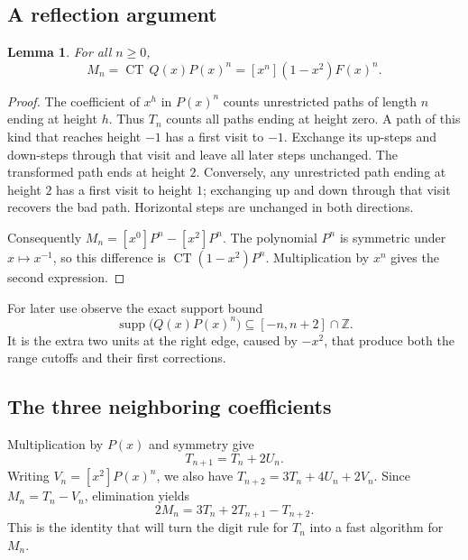 \documentclass[11pt,a4paper]{article}
\numberwithin{equation}{section}
\newtheorem{lemma}[theorem]{Lemma}
\theoremstyle{definition}
\theoremstyle{remark}
\DeclareMathOperator{\CT}{CT}
\DeclareMathOperator{\supp}{supp}
\newcommand{\Z}{\mathbb Z}
\begin{document}
\subsection{A reflection argument}
\begin{lemma}\label{lem:reflection}
For all $n\geq0$,
\begin{equation}\label{eq:Mct}
 M_n=\CT\,Q(x)P(x)^n=[x^n](1-x^2)F(x)^n.
\end{equation}
\end{lemma}
\begin{proof}
The coefficient of $x^h$ in $P(x)^n$ counts unrestricted paths of length
$n$ ending at height $h$. Thus $T_n$ counts all paths ending at height
zero. A path of this kind that reaches height $-1$ has a first visit to
$-1$. Exchange its up-steps and down-steps through that visit and leave
all later steps unchanged. The transformed path ends at height $2$.
Conversely, any unrestricted path ending at height $2$ has a first visit
to height $1$; exchanging up and down through that visit recovers the bad
path. Horizontal steps are unchanged in both directions.

Consequently $M_n=[x^0]P^n-[x^2]P^n$. The polynomial $P^n$ is symmetric
under $x\mapsto x^{-1}$, so this difference is $\CT(1-x^2)P^n$.
Multiplication by $x^n$ gives the second expression.
\end{proof}

For later use observe the exact support bound
\begin{equation}\label{eq:support}
 \supp\bigl(Q(x)P(x)^n\bigr)\subseteq[-n,n+2]\cap\Z.
\end{equation}
It is the extra two units at the right edge, caused by $-x^2$, that
produce both the range cutoffs and their first corrections.

\subsection{The three neighboring coefficients}
Multiplication by $P(x)$ and symmetry give
\begin{equation}\label{eq:Uidentity}
 T_{n+1}=T_n+2U_n.
\end{equation}
Writing $V_n=[x^2]P(x)^n$, we also have
$T_{n+2}=3T_n+4U_n+2V_n$. Since $M_n=T_n-V_n$, elimination yields
\begin{equation}\label{eq:MTidentity}
 \boxed{\quad 2M_n=3T_n+2T_{n+1}-T_{n+2}.\quad}
\end{equation}
This is the identity that will turn the digit rule for $T_n$ into a fast
algorithm for $M_n$.
\end{document}
